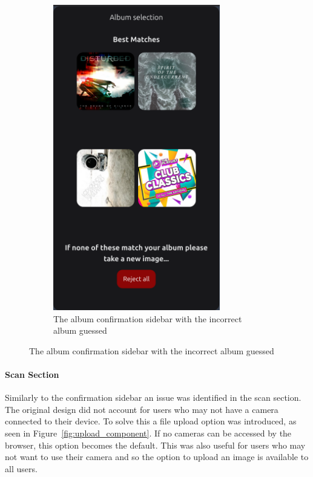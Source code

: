 \begin{figure}[H]
\begin{subfigure}[t]{0.3\textwidth}
        \includegraphics[width=0.8\textwidth]{figures/top_results_confirm.png}
        \caption{The album confirmation sidebar with the incorrect album guessed}
        \label{fig:album_confirmation_sidebar_incorrect}
    \end{subfigure}
\end{figure}

\paragraph{Scan Section}
Similarly to the confirmation sidebar an issue was identified in the scan section. The original design did not account for users who may not have a camera connected to their device. To solve this a file upload option was introduced, as seen in Figure~\ref{fig:upload_component}. If no cameras can be accessed by the browser, this option becomes the default. This was also useful for users who may not want to use their camera and so the option to upload an image is available to all users.

